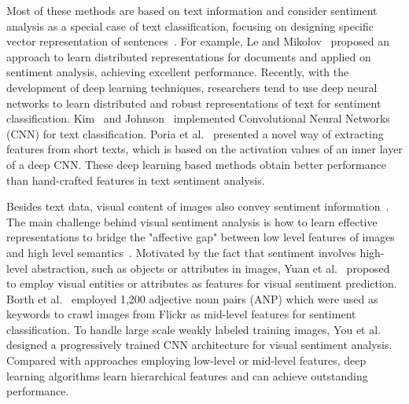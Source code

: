 \documentclass{article}
\begin{document}
Most of these methods are based on text information and consider sentiment analysis as a special case of text classification, focusing on designing specific vector representation of sentences~\cite{pang2008opinion}. For example, Le and Mikolov~\cite{le2014distributed} proposed an approach to learn distributed representations for documents and applied on sentiment analysis, achieving excellent performance. Recently, with the development of deep learning techniques, researchers tend to use deep neural networks to learn distributed and robust representations of text for sentiment classification.  Kim~\cite{kim2014convolutional} and Johnson~\cite{johnson2014effective} implemented Convolutional Neural Networks (CNN) for text classification. Poria et al.~\cite{poria2015deep} presented a novel way of extracting features from short texts, which is based on the activation values of an inner layer of a deep CNN. These deep learning based methods obtain better performance than hand-crafted features in text sentiment analysis.

Besides text data, visual content of images also convey sentiment information~\cite{wang2016beyond}. The main challenge behind visual sentiment analysis is how to learn effective representations to bridge the "affective gap" between low level features of images and high level semantics~\cite{machajdik2010affective}. Motivated by the fact that sentiment involves high-level abstraction, such as objects or attributes in images, Yuan et al.~\cite{yuan2013sentribute} proposed to employ visual entities or attributes as features for visual \mbox{sentiment} prediction. Borth et al.~\cite{borth2013large} employed 1,200 adjective noun pairs (ANP) which were used as keywords to crawl images from Flickr as mid-level features for sentiment classification. To handle large scale weakly labeled training images, You et al.~\cite{you2015robust} designed a progressively trained CNN architecture for visual sentiment analysis. Compared with approaches employing low-level or mid-level features, deep learning algorithms learn hierarchical features and can achieve outstanding performance.
\end{document}
